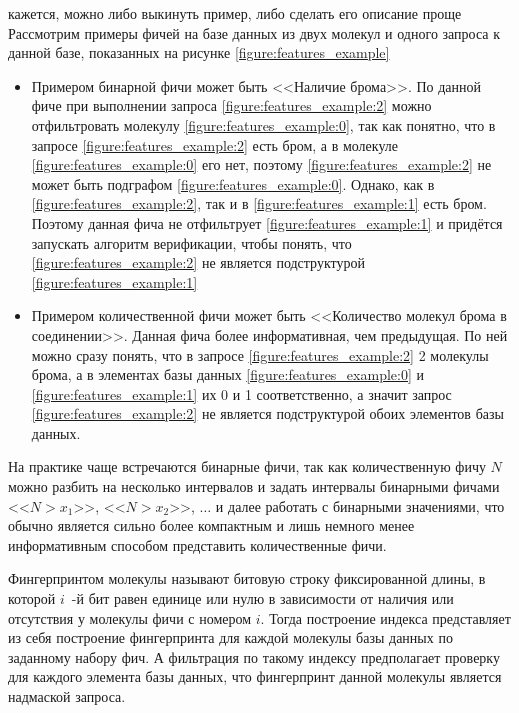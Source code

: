 {\color{red} кажется, можно либо выкинуть пример, либо сделать его описание проще}
Рассмотрим примеры фичей на базе данных из двух молекул и одного запроса к данной базе, показанных на рисунке \ref{figure:features_example}

\begin{itemize}
  \item Примером бинарной фичи может быть <<Наличие брома>>. По данной фиче при выполнении запроса \ref{figure:features_example:2} можно отфильтровать молекулу \ref{figure:features_example:0}, так как понятно, что в запросе \ref{figure:features_example:2} есть бром, а в молекуле \ref{figure:features_example:0} его нет, поэтому \ref{figure:features_example:2} не может быть подграфом \ref{figure:features_example:0}. Однако, как в \ref{figure:features_example:2}, так и в \ref{figure:features_example:1} есть бром. Поэтому данная фича не отфильтрует \ref{figure:features_example:1} и придётся запускать алгоритм верификации, чтобы понять, что \ref{figure:features_example:2} не является подструктурой \ref{figure:features_example:1}

  \item Примером количественной фичи может быть <<Количество молекул брома в соединении>>. Данная фича более информативная, чем предыдущая. По ней можно сразу понять, что в запросе \ref{figure:features_example:2} 2 молекулы брома, а в элементах базы данных \ref{figure:features_example:0} и \ref{figure:features_example:1} их 0 и 1 соответственно, а значит запрос \ref{figure:features_example:2} не является подструктурой обоих элементов базы данных.  
\end{itemize}

На практике чаще встречаются бинарные фичи, так как количественную фичу $N$ можно разбить на несколько интервалов и задать интервалы бинарными фичами <<$N > x_1$>>, <<$N > x_2$>>, $\ldots $ и далее работать с бинарными значениями, что обычно является сильно более компактным и лишь немного менее информативным способом представить количественные фичи. 

Фингерпринтом молекулы называют битовую строку фиксированной длины, в которой $i$~-й бит равен единице или нулю в зависимости от наличия или отсутствия у молекулы фичи с номером $i$. Тогда построение индекса представляет из себя построение фингерпринта для каждой молекулы базы данных по заданному набору фич. А фильтрация по такому индексу предполагает проверку для каждого элемента базы данных, что фингерпринт данной молекулы является надмаской запроса.  

